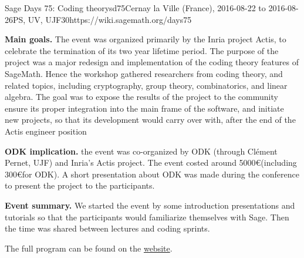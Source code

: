 \begin{event}{Sage Days 75: Coding theory}{sd75}{Cernay la Ville (France), 2016-08-22 to  2016-08-26}{PS, UV, UJF}{30}{https://wiki.sagemath.org/days75}

\textbf{Main goals.} The event was organized primarily by the Inria project
Actis, to celebrate the termination of its two year lifetime period. The purpose
of the project was a major redesign and implementation of the coding theory
features of SageMath. Hence the workshop gathered researchers from coding
theory, and related topics, including cryptography, group theory, combinatorics,
and linear algebra.
The goal was to expose the results of the project to the community ensure its
proper integration into the main frame of the software, and initiate new
projects, so that its development would carry over with, after the end of the
Actis engineer position

\textbf{ODK implication.} the event was co-organized by ODK (through Clément
Pernet, UJF) and Inria's Actis project. The event costed around 5000\euro (including 300\euro for ODK).
A short presentation about ODK was made during the conference to present the project to the participants.

\textbf{Event summary.} We started the event by some introduction presentations and tutorials so that
the participants would familiarize themselves with Sage. Then the time was shared between lectures
and coding sprints.

The full program can be found on the \href{https://wiki.sagemath.org/days75}{website}.

\end{event}
